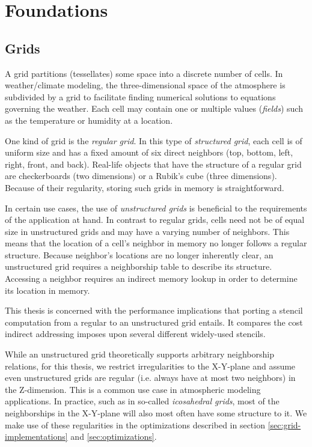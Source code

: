 \chapter{Foundations}                                    \label{sec:foundations}

\section{Grids}                                            \label{sec:grids}

A grid partitions (tessellates) some space into a discrete number of cells. In weather/climate modeling, the three-dimensional space of the atmosphere is subdivided by a grid to facilitate finding numerical solutions to equations governing the weather. Each cell may contain one or multiple values (\emph{fields}) such as the temperature or humidity at a location.

One kind of grid is the \emph{regular grid}. In this type of \emph{structured grid}, each cell is of uniform size and has a fixed amount of six direct neighbors (top, bottom, left, right, front, and back). Real-life objects that have the structure of a regular grid are checkerboards (two dimensions) or a Rubik's cube (three dimensions). Because of their regularity, storing such grids in memory is straightforward.

In certain use cases, the use of \emph{unstructured grids} is beneficial to the requirements of the application at hand. In contrast to regular grids, cells need not be of equal size in unstructured grids and may have a varying number of neighbors. This means that the location of a cell's neighbor in memory no longer follows a regular structure. Because neighbor's locations are no longer inherently clear, an unstructured grid requires a neighborship table to describe its structure. Accessing a neighbor requires an indirect memory lookup in order to determine its location in memory.

This thesis is concerned with the performance implications that porting a stencil computation from a regular to an unstructured grid entails. It compares the cost indirect addressing imposes upon several different widely-used stencils.

While an unstructured grid theoretically supports arbitrary neighborship relations, for this thesis, we restrict irregularities to the X-Y-plane and assume even unstructured grids are regular (i.e. always have at most two neighbors) in the Z-dimension. This is a common use case in atmospheric modeling applications. In practice, such as in so-called \emph{icosahedral grids}, most of the neighborships in the X-Y-plane will also most often have some structure to it. We make use of these regularities in the optimizations described in section \ref{sec:grid-implementations} and \ref{sec:optimizations}.


